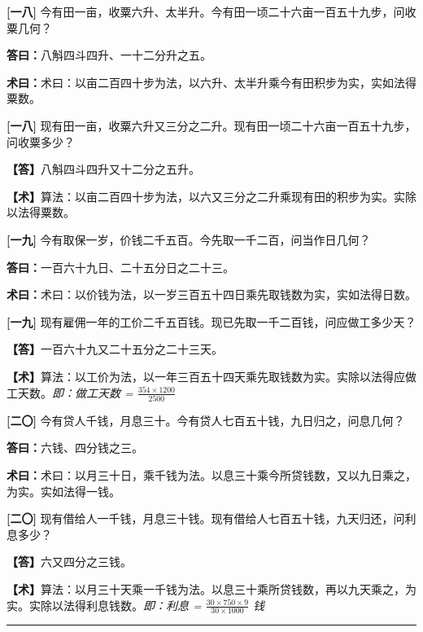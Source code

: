 \documentclass[10pt,a4paper]{article}
\newlength{\lw}
\newlength{\rw}
\newcommand{\bilingc}[2]{%
  \par\vspace{0.1em}%
  \noindent\begin{minipage}[t]{\lw}
  {\small #1}
  \end{minipage}%
  \hfill%
  \begin{minipage}[t]{\rw}
  {\small #2}
  \end{minipage}%
  \vspace{0.1em}%
}
\newcommand{\da}{\textbf{\textcolor{answercolor}{答曰：}}}
\newcommand{\daB}{\textbf{\textcolor{answercolor}{【答】}}}
\newcommand{\shu}{\textbf{\textcolor{methodcolor}{术曰：}}}
\newcommand{\shuB}{\textbf{\textcolor{methodcolor}{【术】}}}
\newcommand{\pn}[1]{\textbf{[#1]}}
\begin{document}
\vspace{0.3em}

\bilingc{
\pn{一八} 今有田一亩，收粟六升、太半升。今有田一顷二十六亩一百五十九步，问收粟几何？

\da 八斛四斗四升、一十二分升之五。

\shu 术曰：以亩二百四十步为法，以六升、太半升乘今有田积步为实，实如法得粟数。
}{
\pn{一八} 现有田一亩，收粟六升又三分之二升。现有田一顷二十六亩一百五十九步，问收粟多少？

\daB 八斛四斗四升又十二分之五升。

\shuB 算法：以亩二百四十步为法，以六又三分之二升乘现有田的积步为实。实除以法得粟数。
}

\vspace{0.3em}

\bilingc{
\pn{一九} 今有取保一岁，价钱二千五百。今先取一千二百，问当作日几何？

\da 一百六十九日、二十五分日之二十三。

\shu 术曰：以价钱为法，以一岁三百五十四日乘先取钱数为实，实如法得日数。
}{
\pn{一九} 现有雇佣一年的工价二千五百钱。现已先取一千二百钱，问应做工多少天？

\daB 一百六十九又二十五分之二十三天。

\shuB 算法：以工价为法，以一年三百五十四天乘先取钱数为实。实除以法得应做工天数。\textit{即：做工天数 = $\frac{354\times1200}{2500}$}
}

\vspace{0.3em}

\bilingc{
\pn{二〇} 今有贷人千钱，月息三十。今有贷人七百五十钱，九日归之，问息几何？

\da 六钱、四分钱之三。

\shu 术曰：以月三十日，乘千钱为法。以息三十乘今所贷钱数，又以九日乘之，为实。实如法得一钱。
}{
\pn{二〇} 现有借给人一千钱，月息三十钱。现有借给人七百五十钱，九天归还，问利息多少？

\daB 六又四分之三钱。

\shuB 算法：以月三十天乘一千钱为法。以息三十乘所贷钱数，再以九天乘之，为实。实除以法得利息钱数。\textit{即：利息 = $\frac{30\times750\times9}{30\times1000}$ 钱}
}

\vspace{0.8em}

\begin{center}
\rule{0.5\textwidth}{0.4pt}
\end{center}
\end{document}
